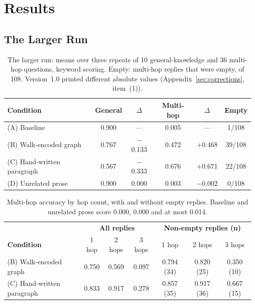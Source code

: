 \documentclass[11pt,a4paper]{article}
\begin{document}
\section{Results}

\subsection{The Larger Run}
\label{sec:larger}

\begin{table}[!htbp]
\centering
\begin{tabular}{lccccc}
\toprule
\textbf{Condition} & \textbf{General} & \textbf{$\Delta$} & \textbf{Multi-hop} & \textbf{$\Delta$} & \textbf{Empty} \\
\midrule
(A) Baseline & 0.900 & --- & 0.005 & --- & 1/108 \\
(B) Walk-encoded graph & 0.767 & $-$0.133 & 0.472 & +0.468 & 39/108 \\
(C) Hand-written paragraph & 0.567 & $-$0.333 & 0.676 & +0.671 & 22/108 \\
(D) Unrelated prose & 0.900 & 0.000 & 0.003 & $-$0.002 & 0/108 \\
\bottomrule
\end{tabular}
\caption{The larger run: means over three repeats of 10 general-knowledge and 36 multi-hop questions, keyword scoring. Empty: multi-hop replies that were empty, of 108. Version~1.0 printed different absolute values (Appendix~\ref{sec:corrections}, item~(1)).}
\label{tab:larger}
\end{table}

\begin{table}[!htbp]
\centering
\begin{tabular}{lcccccc}
\toprule
& \multicolumn{3}{c}{\textbf{All replies}} & \multicolumn{3}{c}{\textbf{Non-empty replies (n)}} \\
\textbf{Condition} & 1 hop & 2 hops & 3 hops & 1 hop & 2 hops & 3 hops \\
\midrule
(B) Walk-encoded graph & 0.750 & 0.569 & 0.097 & 0.794 (34) & 0.820 (25) & 0.350 (10) \\
(C) Hand-written paragraph & 0.833 & 0.917 & 0.278 & 0.857 (35) & 0.917 (36) & 0.667 (15) \\
\bottomrule
\end{tabular}
\caption{Multi-hop accuracy by hop count, with and without empty replies. Baseline and unrelated prose score 0.000, 0.000 and at most 0.014.}
\label{tab:hops}
\end{table}
\end{document}

